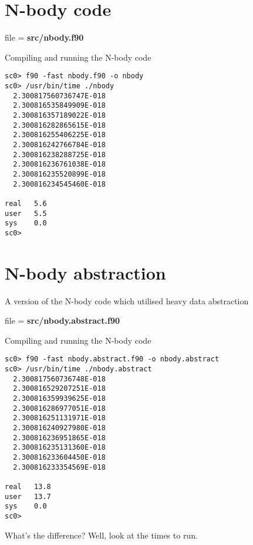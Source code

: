 \documentclass[12pt,a4paper,oneside,openany]{report}
\newcommand{\fcode}[1]{\par \small file = \textbf{#1}  \normalsize}
\begin{document}
\newpage

\section*{N-body code}

\fcode{src/nbody.f90}

Compiling and running the N-body code
\begin{verbatim}
sc0> f90 -fast nbody.f90 -o nbody
sc0> /usr/bin/time ./nbody 
  2.300817560736747E-018
  2.300816535849909E-018
  2.300816357189022E-018
  2.300816282865615E-018
  2.300816255406225E-018
  2.300816242766784E-018
  2.300816238288725E-018
  2.300816236761038E-018
  2.300816235520899E-018
  2.300816234545460E-018

real   5.6
user   5.5
sys    0.0
sc0> 
\end{verbatim}

\newpage

\section*{N-body abstraction}
A version of the N-body code which utilised heavy data abstraction

\fcode{src/nbody.abstract.f90}

Compiling and running the N-body code
\begin{verbatim}
sc0> f90 -fast nbody.abstract.f90 -o nbody.abstract
sc0> /usr/bin/time ./nbody.abstract 
  2.300817560736748E-018
  2.300816529207251E-018
  2.300816359939625E-018
  2.300816286977051E-018
  2.300816251131971E-018
  2.300816240927980E-018
  2.300816236951865E-018
  2.300816235131360E-018
  2.300816233604450E-018
  2.300816233354569E-018

real   13.8
user   13.7
sys    0.0
sc0> 
\end{verbatim}

What's the difference?  Well, look at the times to run.
\end{document}
